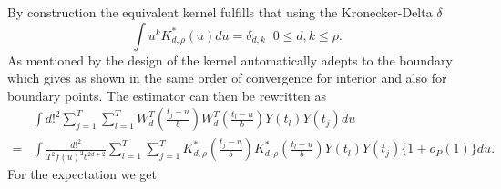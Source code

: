 By construction the equivalent kernel fulfills that using the Kronecker-Delta $\delta$
\begin{equation}
\label{kron}
\int u^k K_{d,\rho}^*\left( u \right) du  = \delta_{d,k} \; \; 0 \leq d , k \leq \rho. %
\end{equation}
As mentioned by \cite{Fan1995} the design of the kernel automatically adepts to the boundary which gives as shown in \cite{Ruppert:94} the same order of convergence for interior and also for boundary points. The estimator can then be rewritten as 
\begin{equation}
\begin{split}
&\int d!^2  \sum_{j=1}^{T} \sum_{l=1}^{T} W_d^T\left(\frac{t_{j}-u}{b}\right)  W_d^T\left(\frac{t_{l}-u}{b} \right) Y(t_{l}) Y(t_{j}) du \\
=& \int \frac{d!^2}{T^2 f(u)^2 b^{2d+2}} \sum_{l=1}^{T}  \sum_{j=1}^{T} K_{d,\rho}^*\left(\frac{t_{j}-u}{b}\right) K_{d,\rho}^*\left(\frac{t_{l}-u}{b} \right) Y(t_{l})Y(t_{j})\{ 1+ o_P(1) \} du.
\end{split}
\end{equation}
For the expectation we get
